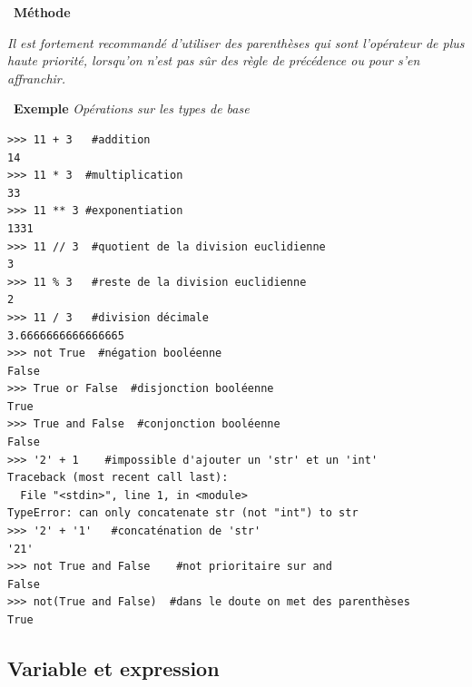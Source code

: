 \documentclass[a4paper, french, 12pt]{article}  %
\newcounter{exple}
\newenvironment{exemple}[1]
{\par \medskip   \addtocounter{exple}{1} \noindent  
\begin{bclogo}[arrondi =0.1,   noborder = true, logo=\bclampe, marge=4]{~\textbf{Exemple} \textbf{\theexple} {\itshape #1} }  \par}
{
\end{bclogo}
 \par \bigskip }
\newenvironment{methode}[1]
{\par \medskip    \noindent  
 \begin {bclogo}[arrondi =0.1,logo=\bcoutil, marge=4,noborder = true] {~\textbf{Méthode}   {\itshape #1} }  \par}
{
\end{bclogo}
 \par \bigskip }
\begin{document}
\begin{methode}{}
 

{\itshape Il est fortement recommandé d'utiliser des parenthèses qui sont l'opérateur de plus haute priorité, lorsqu'on n'est pas sûr des règle de précédence ou pour s'en affranchir. }



\end{methode}

\begin{exemple}{Opérations sur les types de base}

\begin{lstlisting}[style=compil]
>>> 11 + 3   #addition
14
>>> 11 * 3  #multiplication
33
>>> 11 ** 3 #exponentiation
1331
>>> 11 // 3  #quotient de la division euclidienne
3
>>> 11 % 3   #reste de la division euclidienne
2
>>> 11 / 3   #division décimale
3.6666666666666665
>>> not True  #négation booléenne
False
>>> True or False  #disjonction booléenne
True
>>> True and False  #conjonction booléenne
False
>>> '2' + 1    #impossible d'ajouter un 'str' et un 'int'
Traceback (most recent call last):
  File "<stdin>", line 1, in <module>
TypeError: can only concatenate str (not "int") to str
>>> '2' + '1'   #concaténation de 'str'
'21'
>>> not True and False    #not prioritaire sur and
False
>>> not(True and False)  #dans le doute on met des parenthèses
True
\end{lstlisting}

\end{exemple}


\subsection{Variable et expression}
\end{document}
